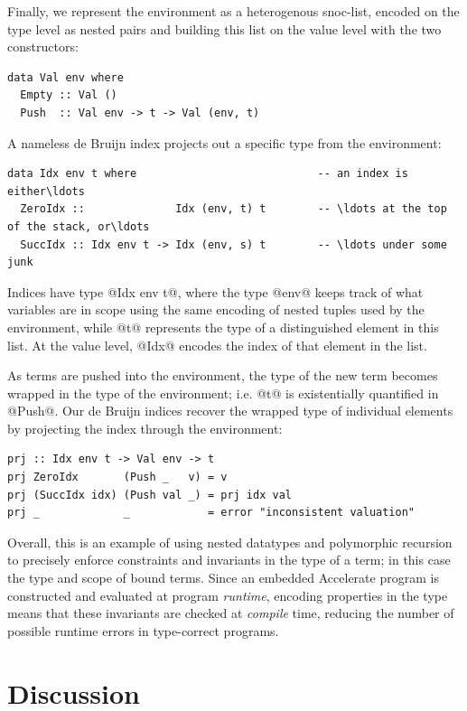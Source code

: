 Finally, we represent the environment as a heterogenous snoc-list, encoded on
the type level as nested pairs and building this list on the value level with
the two constructors:
%
\begin{lstlisting}[style=haskell]
data Val env where
  Empty :: Val ()
  Push  :: Val env -> t -> Val (env, t)
\end{lstlisting}
%
A nameless de Bruijn index projects out a specific type from the environment:
%
\begin{lstlisting}[style=haskell]
data Idx env t where                            -- an index is either\ldots
  ZeroIdx ::              Idx (env, t) t        -- \ldots at the top of the stack, or\ldots
  SuccIdx :: Idx env t -> Idx (env, s) t        -- \ldots under some junk
\end{lstlisting}
%
Indices have type @Idx env t@, where the type @env@ keeps track of what
variables are in scope using the same encoding of nested tuples used by the
environment, while @t@ represents the type of a distinguished element in this
list. At the value level, @Idx@ encodes the index of that element in the list.

As terms are pushed into the environment, the type of the new term becomes
wrapped in the type of the environment; i.e. @t@ is existentially quantified in
@Push@. Our de Bruijn indices recover the wrapped type of individual elements by
projecting the index through the environment:
%
\begin{lstlisting}[style=haskell]
prj :: Idx env t -> Val env -> t
prj ZeroIdx       (Push _   v) = v
prj (SuccIdx idx) (Push val _) = prj idx val
prj _             _            = error "inconsistent valuation"
\end{lstlisting}

Overall, this is an example of using nested datatypes and polymorphic recursion
to precisely enforce constraints and invariants in the type of a term; in this
case the type and scope of bound terms. Since an embedded Accelerate program is
constructed and evaluated at program \emph{runtime}, encoding properties in the
type means that these invariants are checked at \emph{compile} time, reducing
the number of possible runtime errors in type-correct programs.



\section{Discussion}

